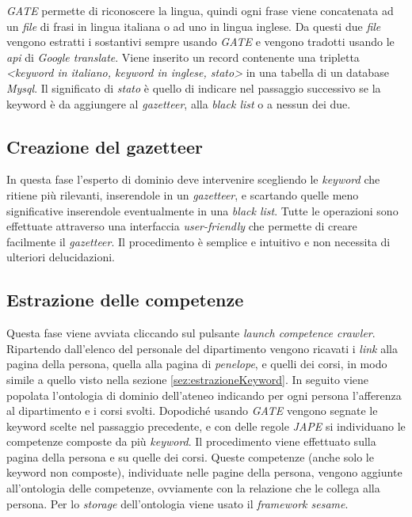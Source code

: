 \documentclass[tesi.tex]{subfiles}
\begin{document}
\emph{GATE} permette di riconoscere la lingua, quindi ogni
frase viene concatenata ad un \emph{file} di frasi in lingua italiana o ad
uno in lingua inglese. Da questi due \emph{file} vengono
estratti i sostantivi sempre usando \emph{GATE} e vengono tradotti
usando le \emph{api} di \emph{Google translate}. Viene inserito un
record contenente una tripletta \emph{<keyword in italiano, keyword in
  inglese, stato>} in una tabella di un database \emph{Mysql}. Il
significato di \emph{stato} \`e quello di indicare nel passaggio
successivo se la keyword \`e da aggiungere al \emph{gazetteer}, alla
\emph{black list} o a nessun dei due.

\subsection{Creazione del gazetteer}
In questa fase l'esperto di dominio deve intervenire scegliendo le
\emph{keyword} che ritiene pi\`u rilevanti, inserendole in un
\emph{gazetteer}, e scartando quelle meno significative inserendole
eventualmente in una \emph{black list}. Tutte le operazioni sono
effettuate attraverso una interfaccia \emph{user-friendly} che
permette di creare facilmente il \emph{gazetteer}. Il procedimento \`e semplice e
intuitivo e non necessita di ulteriori delucidazioni.

\subsection{Estrazione delle competenze}
Questa fase viene avviata cliccando sul pulsante \emph{launch
  competence crawler}. Ripartendo dall'elenco del personale del
dipartimento vengono ricavati i \emph{link} alla pagina della persona,
quella alla pagina di \emph{penelope}, e quelli dei corsi, in modo
simile a quello visto nella sezione \ref{sez:estrazioneKeyword}. In
seguito viene popolata l'ontologia di dominio dell'ateneo indicando per ogni persona
l'afferenza al dipartimento e i corsi svolti. Dopodich\'e usando
\emph{GATE} vengono segnate le keyword scelte nel passaggio
precedente, e con delle regole \emph{JAPE} si individuano
le competenze composte da pi\`u \emph{keyword}. Il procedimento viene
effettuato sulla pagina della persona e su quelle dei corsi. Queste
competenze (anche solo le keyword non composte), individuate
nelle pagine della persona, vengono aggiunte all'ontologia delle competenze, ovviamente
con la relazione che le collega alla persona. Per lo \emph{storage} dell'ontologia viene
usato il \emph{framework sesame}.
\end{document}
